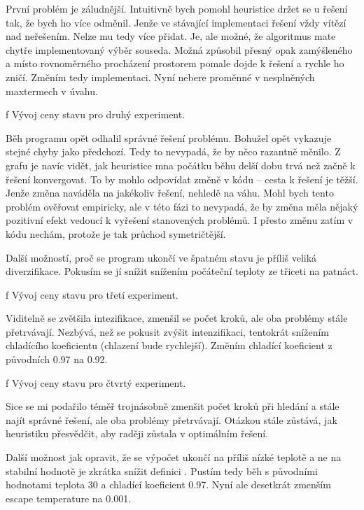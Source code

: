 První problém je záludnější. Intuitivně bych pomohl heuristice držet se u řešení tak, že bych ho více odměnil. Jenže ve stávající implementaci řešení vždy vítězí nad neřešením. Nelze mu tedy více přidat. Je, ale možné, že algoritmus mate chytře implementovaný výběr souseda. Možná způsobil přesný opak zamýšleného a místo rovnoměrného procházení prostorem pomale dojde k řešení a rychle ho zničí. Změním tedy implementaci. Nyní nebere proměnné v nesplněných maxtermech v úvahu.

\centerline{ \picwidth=15cm  }
\caption/f Vývoj ceny stavu pro druhý experiment.
\bigskip

Běh programu opět odhalil správné řešení problému. Bohužel opět vykazuje stejné chyby jako předchozí. Tedy to nevypadá, že by něco razantně měnilo. Z grafu je navíc vidět, jak heuristice mna počátku běhu delší dobu trvá než začně k řešení konvergovat. To by mohlo odpovídat změně v kódu -- cesta k řešení je těžší. Jenže změna naváděla na jakékoliv řešení, nehledě na váhu. Mohl bych tento problém ověřovat empiricky, ale v této fázi to nevypadá, že by změna měla nějaký pozitivní efekt vedoucí k vyřešení stanovených problémů. I přesto změnu zatím v kódu nechám, protože je tak průchod symetričtější.

Další možností, proč se program ukončí ve špatném stavu je příliš veliká diverzifikace. Pokusím se jí snížit snížením počáteční teploty ze třiceti na patnáct.

\centerline{ \picwidth=15cm  }
\caption/f Vývoj ceny stavu pro třetí experiment.
\bigskip

Viditelně se zvětšila intezifikace, zmenšil se počet kroků, ale oba problémy stále přetrvávají. Nezbývá, než se pokusit zvýšit intenzifikaci, tentokrát snížením chladícího koeficientu (chlazení bude rychlejší). Změním chladící koeficient z původních 0.97 na 0.92.

\centerline{ \picwidth=15cm  }
\caption/f Vývoj ceny stavu pro čtvrtý experiment.
\bigskip

Sice se mi podařilo téměř trojnásobně zmenšit počet kroků při hledání a stále najít správné řešení, ale oba problémy přetrvávají. Otázkou stále zůstává, jak heuristiku přesvědčit, aby raději zůstala v optimálním řešení.

Další možnost jak opravit, že se výpočet ukončí na příliš nízké teplotě a ne na stabilní hodnotě je zkrátka snížit definici . Pustím tedy běh s původními hodnotami teplota 30 a chladící koeficient 0.97. Nyní ale desetkrát zmenším escape temperature na 0.001.


